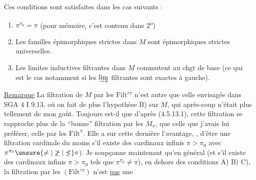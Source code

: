 
Ces conditions sont satisfaites dans les  cas suivants :
\begin{enumerate}[label={},leftmargin=2em]
\item[A)] $\pi^{\pi_0}=\pi$ (pour mémoire, c'est contenu dans 2\textsuperscript{o})
\item[B)] Les familles épimorphiques strictes dans $M$ sont épimorphiques strictes universelles.
\item[C)] Les limites inductives filtrantes dans $M$ commutent au chgt de base (ce qui est le cas notamment si les $\varinjlim$ filtrantes sont exactes  à gauche).
\end{enumerate}
\uline{Remarque} La filtration de $M$ par les $\mathrm{Filt}'{}^\pi$ n'est autre que celle envisagée dans SGA 4 I 9.13, où on fait de plus l'hypothèse B) sur $M$, qui après-coup n'était plus tellement de mon goût. Toujours est-il que d'après (4.5.13.1), cette filtration se rapproche plus de la ``bonne'' filtration par les $M_\pi$, que celle que j'avais   lui préférer, celle par les $\mathrm{Filt}^\pi$. Elle a  sur cette dernière l'avantage, , d'être une filtration cardinale    du moins s'il existe des cardinaux infinis $\pi>\pi_0$ avec $\pi^{\pi_0}\unsure{\neq|\not\geq|\not\leq}\pi$). Je soupçonne  maintenant qu'en général (et s'il existe des cardinaux infinis $\pi>\pi_0$ tels que $\pi^{\pi_0}\neq\pi$), en dehors des conditions A) B) C), la filtration par les $(\mathrm{Filt}'{}^\pi)$ n'est \uline{pas} une

